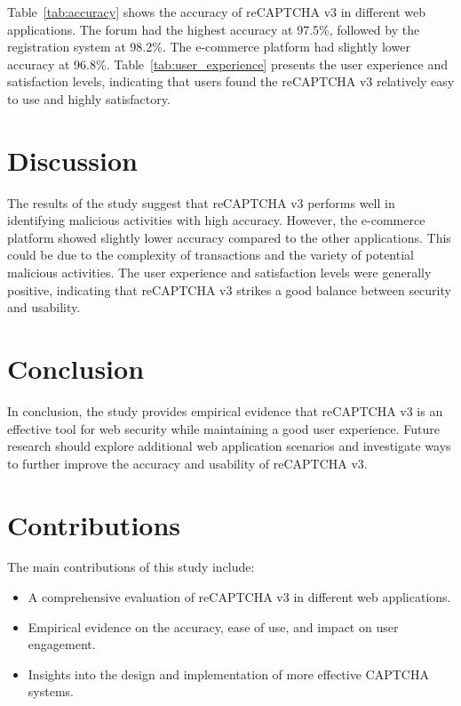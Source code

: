 \documentclass{article}
\begin{document}
Table~\ref{tab:accuracy} shows the accuracy of reCAPTCHA v3 in different web applications. The forum had the highest accuracy at 97.5\%, followed by the registration system at 98.2\%. The e-commerce platform had slightly lower accuracy at 96.8\%. Table~\ref{tab:user_experience} presents the user experience and satisfaction levels, indicating that users found the reCAPTCHA v3 relatively easy to use and highly satisfactory.

\section{Discussion}
\label{sec:discussion}

The results of the study suggest that reCAPTCHA v3 performs well in identifying malicious activities with high accuracy. However, the e-commerce platform showed slightly lower accuracy compared to the other applications. This could be due to the complexity of transactions and the variety of potential malicious activities. The user experience and satisfaction levels were generally positive, indicating that reCAPTCHA v3 strikes a good balance between security and usability.

\section{Conclusion}
\label{sec:conclusion}

In conclusion, the study provides empirical evidence that reCAPTCHA v3 is an effective tool for web security while maintaining a good user experience. Future research should explore additional web application scenarios and investigate ways to further improve the accuracy and usability of reCAPTCHA v3.

\section{Contributions}
\label{sec:contributions}

The main contributions of this study include:
\begin{itemize}
    \item A comprehensive evaluation of reCAPTCHA v3 in different web applications.
    \item Empirical evidence on the accuracy, ease of use, and impact on user engagement.
    \item Insights into the design and implementation of more effective CAPTCHA systems.
\end{itemize}



\end{document}
